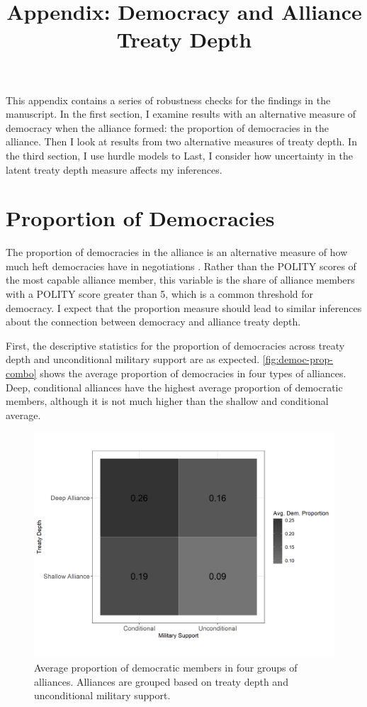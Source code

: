 \documentclass[12pt]{article}
\title{\textbf{Appendix: Democracy and Alliance Treaty Depth}}
\author{}
\date{}
\begin{document}
\maketitle 

\doublespace 

This appendix contains a series of robustness checks for the findings in the manuscript. 
In the first section, I examine results with an alternative measure of democracy when the alliance formed: the proportion of democracies in the alliance. 
Then I look at results from two alternative measures of treaty depth.
In the third section, I use hurdle models to   
Last, I consider how uncertainty in the latent treaty depth measure affects my inferences. 


\section{Proportion of Democracies}


The proportion of democracies in the alliance is an alternative measure of how much heft democracies have in negotiations \cite{Chibaetal2015}.  
Rather than the POLITY scores of the most capable alliance member, this variable is the share of alliance members with a POLITY score greater than 5, which is a common threshold for democracy. 
I expect that the proportion measure should lead to similar inferences about the connection between democracy and alliance treaty depth.

First, the descriptive statistics for the proportion of democracies across treaty depth and unconditional military support are as expected. 
\autoref{fig:democ-prop-combo} shows the average proportion of democracies in four types of alliances. 
Deep, conditional alliances have the highest average proportion of democratic members, although it is not much higher than the shallow and conditional average.  


\begin{figure}
\includegraphics[width=.95\textwidth]{democ-prop-combo.png}  
\caption{Average proportion of democratic members in four groups of alliances. Alliances are grouped based on treaty depth and unconditional military support.}
\label{fig:democ-prop-combo}
\end{figure}
\end{document}
